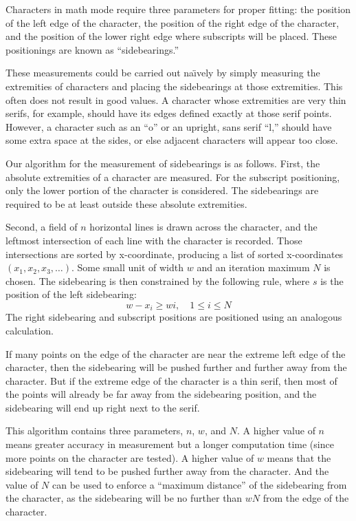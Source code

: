 
Characters in math mode require three parameters for proper fitting: the
position of the left edge of the character, the position of the right edge of
the character, and the position of the lower right edge where subscripts will be
placed. These positionings are known as ``sidebearings.''

These measurements could be carried out na\"\i vely by simply measuring the
extremities of characters and placing the sidebearings at those extremities.
This often does not result in good values. A character whose extremities are
very thin serifs, for example, should have its edges defined exactly at those
serif points. However, a character such as an ``o'' or an upright, sans serif
``\textsf{l},'' should have some extra space at the sides, or else adjacent
characters will appear too close.

Our algorithm for the measurement of sidebearings is as follows. First, the
absolute extremities of a character are measured. For the subscript positioning,
only the lower portion of the character is considered. The sidebearings are
required to be at least outside these absolute extremities.

Second, a field of $n$ horizontal lines is drawn across the character, and
the leftmost intersection of each line with the character is recorded. Those
intersections are sorted by x-coordinate, producing a list of sorted
x-coordinates $(x_1, x_2, x_3,\ldots)$. Some small unit of width $w$ and an
iteration maximum $N$ is chosen. The sidebearing is then constrained by the
following rule, where $s$ is the position of the left sidebearing:
\[
w-x_i \ge wi,\quad 1 \le i \le N
\]
The right sidebearing and subscript positions are positioned using an analogous
calculation.

If many points on the edge of the character are near the extreme left edge of
the character, then the sidebearing will be pushed further and further away from
the character. But if the extreme edge of the character is a thin serif, then
most of the points will already be far away from the sidebearing position, and
the sidebearing will end up right next to the serif.

This algorithm contains three parameters, $n$, $w$, and $N$. A higher value of
$n$ means greater accuracy in measurement but a longer computation time (since
more points on the character are tested). A higher value of $w$ means that the
sidebearing will tend to be pushed further away from the character. And the
value of $N$ can be used to enforce a ``maximum distance'' of the sidebearing
from the character, as the sidebearing will be no further than $wN$ from the
edge of the character.

